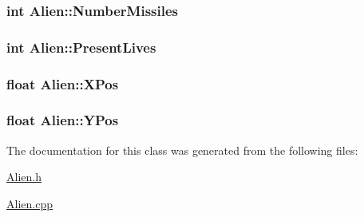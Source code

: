 \hypertarget{classAlien_acef360d7d4e79ad81fdabacc9c999674}{
\subsubsection[{Number\-Missiles}]{\setlength{\rightskip}{0pt plus 5cm}int Alien\-::\-Number\-Missiles\hspace{0.3cm}{\ttfamily [private]}}}\label{classAlien_acef360d7d4e79ad81fdabacc9c999674}
\hypertarget{classAlien_ab52ccb6a1c9947a2023b509ef989a249}{
\subsubsection[{Present\-Lives}]{\setlength{\rightskip}{0pt plus 5cm}int Alien\-::\-Present\-Lives\hspace{0.3cm}{\ttfamily [private]}}}\label{classAlien_ab52ccb6a1c9947a2023b509ef989a249}
\hypertarget{classAlien_a96c0ea999273c8c9866bd173d8f903b6}{
\subsubsection[{X\-Pos}]{\setlength{\rightskip}{0pt plus 5cm}float Alien\-::\-X\-Pos\hspace{0.3cm}{\ttfamily [private]}}}\label{classAlien_a96c0ea999273c8c9866bd173d8f903b6}
\hypertarget{classAlien_a89b5e19378646e2a81440ab030cdd6e3}{
\subsubsection[{Y\-Pos}]{\setlength{\rightskip}{0pt plus 5cm}float Alien\-::\-Y\-Pos\hspace{0.3cm}{\ttfamily [private]}}}\label{classAlien_a89b5e19378646e2a81440ab030cdd6e3}


The documentation for this class was generated from the following files\-:\begin{DoxyCompactItemize}
\item 
\hyperlink{Alien_8h}{Alien.\-h}\item 
\hyperlink{Alien_8cpp}{Alien.\-cpp}\end{DoxyCompactItemize}
